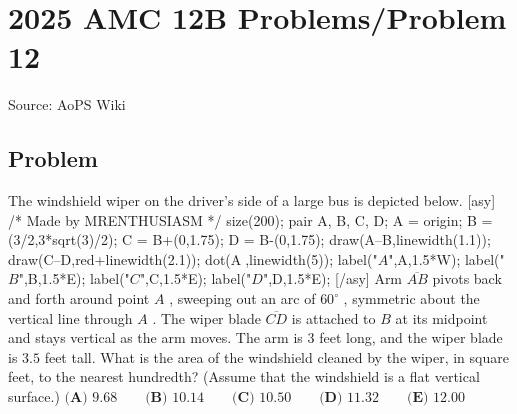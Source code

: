 \documentclass[12pt]{article}
\begin{document}
\section*{{2025 AMC 12B Problems/Problem 12}}
Source: AoPS Wiki

\subsection*{Problem}
The windshield wiper on the driver's side of a large bus is depicted below. [asy] /* Made by MRENTHUSIASM */ size(200); pair A, B, C, D; A = origin; B = (3/2,3*sqrt(3)/2); C = B+(0,1.75); D = B-(0,1.75); draw(A--B,linewidth(1.1)); draw(C--D,red+linewidth(2.1)); dot(A^^B,linewidth(5)); label("$A$",A,1.5*W); label("$B$",B,1.5*E); label("$C$",C,1.5*E); label("$D$",D,1.5*E); [/asy] Arm $\overline{AB}$ pivots back and forth around point $A$ , sweeping out an arc of $60^{\circ}$ , symmetric about the vertical line through $A$ . The wiper blade $\overline{CD}$ is attached to $B$ at its midpoint and stays vertical as the arm moves. The arm is $3$ feet long, and the wiper blade is $3.5$ feet tall. What is the area of the windshield cleaned by the wiper, in square feet, to the nearest hundredth? (Assume that the windshield is a flat vertical surface.) $\textbf{(A) } 9.68 \qquad \textbf{(B) } 10.14 \qquad \textbf{(C) } 10.50 \qquad \textbf{(D) } 11.32 \qquad \textbf{(E) } 12.00$
\end{document}
